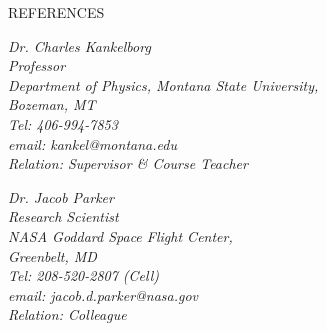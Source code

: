 \documentclass{resume} %
\begin{document}


\begin{rSection}{REFERENCES}
\begin{minipage}[h]{0.5\textwidth}
{\sl Dr. Charles Kankelborg\\
Professor\\
Department of Physics, Montana State University,\\Bozeman, MT\\
Tel: 406-994-7853\\
email: kankel@montana.edu\\
Relation: Supervisor \& Course Teacher} 
\end{minipage}
\hfill
\begin{minipage}[h]{0.5\textwidth}
{\sl Dr. Jacob Parker\\
Research Scientist\\
NASA Goddard Space Flight Center,\\ Greenbelt, MD\\
Tel: 208-520-2807 (Cell)\\
email: jacob.d.parker@nasa.gov\\
Relation: Colleague} 
\end{minipage}
\hfill
\end{rSection}
\end{document}
